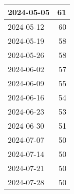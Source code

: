 \begin{longtable}[h!]{|l|r|}
2024-05-05 &            61 \\ \hline
2024-05-12 &            60 \\ \hline
2024-05-19 &            58 \\ \hline
2024-05-26 &            58 \\ \hline
2024-06-02 &            57 \\ \hline
2024-06-09 &            55 \\ \hline
2024-06-16 &            54 \\ \hline
2024-06-23 &            53 \\ \hline
2024-06-30 &            51 \\ \hline
2024-07-07 &            50 \\ \hline
2024-07-14 &            50 \\ \hline
2024-07-21 &            50 \\ \hline
2024-07-28 &            50 \\ \hline
\end{longtable}
\endgroup








